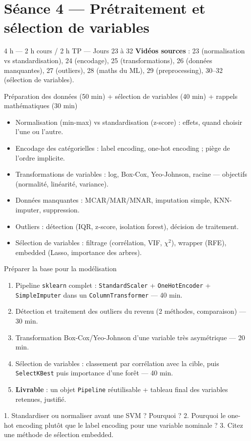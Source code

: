 \documentclass[11pt,a4paper]{article}
\begin{document}
\section*{Séance 4 — Prétraitement et sélection de variables}
\begin{seancebox}{4 h — 2 h cours / 2 h TP — Jours 23 à 32}
\textbf{Vidéos sources} : 23 (normalisation vs standardisation), 24 (encodage), 25 (transformations), 26 (données manquantes), 27 (outliers), 28 (maths du ML), 29 (preprocessing), 30--32 (sélection de variables).
\end{seancebox}
\begin{coursbox}{Préparation des données (50 min) + sélection de variables (40 min) + rappels mathématiques (30 min)}
\begin{itemize}[nosep]
\item Normalisation (min-max) vs standardisation (z-score) : effets, quand choisir l'une ou l'autre.
\item Encodage des catégorielles : label encoding, one-hot encoding ; piège de l'ordre implicite.
\item Transformations de variables : log, Box-Cox, Yeo-Johnson, racine — objectifs (normalité, linéarité, variance).
\item Données manquantes : MCAR/MAR/MNAR, imputation simple, KNN-imputer, suppression.
\item Outliers : détection (IQR, z-score, isolation forest), décision de traitement.
\item Sélection de variables : filtrage (corrélation, VIF, $\chi^2$), wrapper (RFE), embedded (Lasso, importance des arbres).
\end{itemize}
\end{coursbox}
\begin{tpbox}{Préparer la base pour la modélisation}
\begin{enumerate}[nosep]
\item Pipeline \texttt{sklearn} complet : \texttt{StandardScaler} + \texttt{OneHotEncoder} + \texttt{SimpleImputer} dans un \texttt{ColumnTransformer} — 40 min.
\item Détection et traitement des outliers du revenu (2 méthodes, comparaison) — 30 min.
\item Transformation Box-Cox/Yeo-Johnson d'une variable très asymétrique — 20 min.
\item Sélection de variables : classement par corrélation avec la cible, puis \texttt{SelectKBest} puis importance d'une forêt — 40 min.
\item \textbf{Livrable} : un objet \texttt{Pipeline} réutilisable + tableau final des variables retenues, justifié.
\end{enumerate}
\end{tpbox}
\begin{evalbox}
1. Standardiser ou normaliser avant une SVM ? Pourquoi ? 2. Pourquoi le one-hot encoding plutôt que le label encoding pour une variable nominale ? 3. Citez une méthode de sélection embedded.
\end{evalbox}
\end{document}
